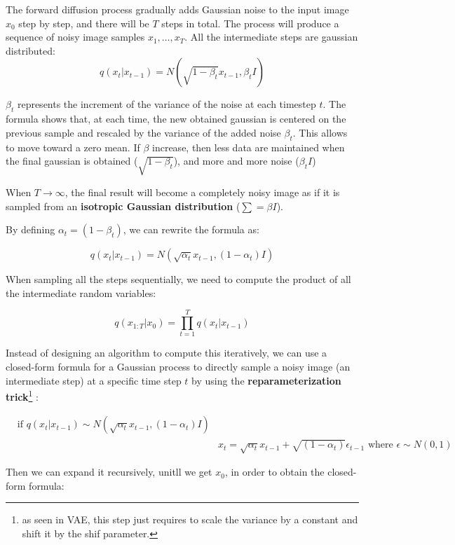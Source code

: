The forward diffusion process gradually adds Gaussian noise to the input image $x_0$ step by step, and there will be $T$ steps in total. The process will produce a sequence of noisy image samples $x_1, \dots, x_T$. All the intermediate steps are gaussian distributed: $$q(x_{t}|x_{t-1}) = N(\sqrt{1-\beta_t}x_{t-1}, \beta_t I)$$

$\beta_t$ represents the increment of the variance of the noise at each timestep $t$.
The formula shows that, at each time, the new obtained gaussian is centered on the previous sample and rescaled by the variance of the added noise $\beta_t$. This allows to move toward a zero mean. If $\beta$ increase, then less data are maintained when the final gaussian is obtained  ($\sqrt{1-\beta_t}$), and more and more noise ($\beta_t I$)

When $T \longrightarrow \infty$, the final result will become a completely noisy image as if it is sampled from an \textbf{isotropic Gaussian distribution} ($\sum = \beta I$).

By defining $\alpha_t = (1- \beta_t)$, we can rewrite the formula as:

$$q(x_{t}|x_{t-1}) = N(\sqrt{\alpha_t}x_{t-1}, (1-\alpha_t) I)$$

When sampling all the steps sequentially, we need to compute the product of all the intermediate random variables:

$$q(x_{1:T}|x_0) = \prod_{t=1}^{T}q(x_t|x_{t-1})$$

Instead of designing an algorithm to compute this iteratively, we can use a closed-form formula for a Gaussian process to directly sample a noisy image (an intermediate step) at a specific time step $t$ by using the \textbf{reparameterization trick}\footnote{as seen in VAE, this step just requires to scale the variance by a constant and shift it by the shif parameter.} :


\begin{equation}
\begin{aligned}
    &\text{if } q(x_t|x_{t-1}) \sim N(\sqrt{\alpha_t}x_{t-1}, (1-\alpha_t) I) \\
    & 
    
    &x_t = \sqrt{\alpha_t}x_{t-1} + \sqrt{(1-\alpha_t)} \epsilon_{t-1}\text{ where } \epsilon \sim N(0,1)
\end{aligned}
\end{equation}

Then we can expand it recursively, unitll we get $x_0$, in order to obtain the closed-form formula:

